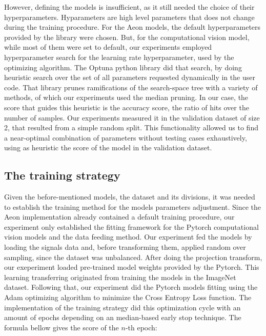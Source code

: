 



However, defining the models is insufficient, as it still needed the choice of their hyperparameters. Hyparameters are high level parameters that does not change during the training procedure. For the Aeon models, the default hyperparameters provided by the library were chosen. But, for the computational vision model, while most of them were set to default, our experiments employed hyperparameter search for the learning rate hyperparameter, used by the optimizing algorithm. The Optuna python library \cite{OptunaDoc} did that search, by doing heuristic search over the set of all parameters requested dynamically in the user code. That library prunes ramifications of the search-space tree with a variety of methods, of which our experiments used the median pruning. In our case, the score that guides this heuristic is the accuracy score, the ratio of hits over the number of samples. Our experiments measured it in the validation dataset of size 2, that resulted from a simple random split. This functionality allowed us to find a near-optimal combination of parameters without testing cases exhaustively, using as heuristic the score of the model in the validation dataset.

\subsection{The training strategy}

Given the before-mentioned models, the dataset and its divisions, it was needed to establish the training method for the models parameters adjustment. Since the Aeon implementation already contained a default training procedure, our experiment only established the fitting framework for the Pytorch computational vision models and the data feeding method. Our experiment fed the models by loading the signals data and, before transforming them, applied random over sampling, since the dataset was unbalanced. After doing the projection transform, our exeperiment loaded pre-trained model weights provided by the Pytorch. This learning transferring originated from training the models in the ImageNet \cite{ImageNet} dataset. Following that, our experiment did the Pytorch models fitting using the Adam optimizing algorithm \cite{Adam} to minimize the Cross Entropy Loss function. The implementation of the training strategy did this optimization cycle with an amount of epochs depending on an median-based early stop technique. The formula bellow gives the score of the $n$-th epoch:

